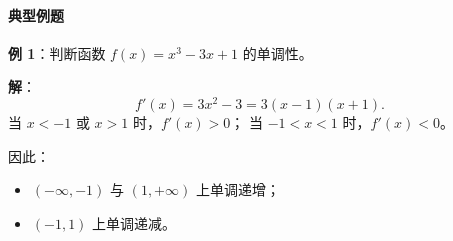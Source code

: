 \begin{examplebox}
\paragraph{典型例题}

\textbf{例 1}：判断函数 $f(x)=x^3-3x+1$ 的单调性。

\textbf{解}：
\[
f'(x)=3x^2-3=3(x-1)(x+1).
\]
当 $x<-1$ 或 $x>1$ 时，$f'(x)>0$；
当 $-1<x<1$ 时，$f'(x)<0$。

因此：
\begin{itemize}
  \item $(-\infty,-1)$ 与 $(1,+\infty)$ 上单调递增；
  \item $(-1,1)$ 上单调递减。
\end{itemize}
\end{examplebox}